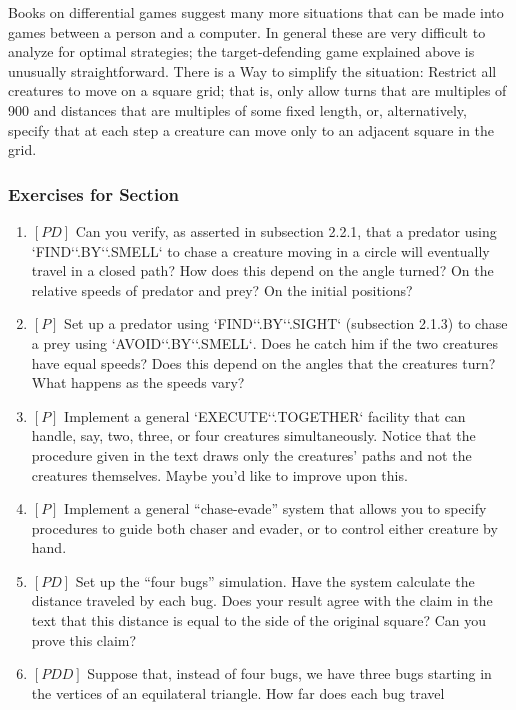 \documentclass{book}
\begin{document}
Books on differential games suggest many more situations that can be
made into games between a person and a computer. In general these
are very difficult to analyze for optimal strategies; the target-defending
game explained above is unusually straightforward. There is a Way to
simplify the situation: Restrict all creatures to move on a square grid;
that is, only allow turns that are multiples of 900 and distances that
are multiples of some fixed length, or, alternatively, specify that at each
step a creature can move only to an adjacent square in the grid.

\subsubsection{Exercises for Section \thesection}
\begin{enumerate}
\item $[PD]$ Can you verify, as asserted in subsection 2.2.1, that a predator
using \textsc{`FIND`}\textsc{`.BY`}\textsc{`.SMELL`} to chase a creature moving in a circle will eventually travel in a closed path? How does this depend on the angle turned?
On the relative speeds of predator and prey? On the initial positions?
\item $[P]$ Set up a predator using \textsc{`FIND`}\textsc{`.BY`}\textsc{`.SIGHT`} (subsection 2.1.3) to chase
a prey using \textsc{`AVOID`}\textsc{`.BY`}\textsc{`.SMELL`}. Does he catch him if the two creatures
have equal speeds? Does this depend on the angles that the creatures
turn? What happens as the speeds vary?
\item $[P]$ Implement a general \textsc{`EXECUTE`}\textsc{`.TOGETHER`} facility that can handle,
say, two, three, or four creatures simultaneously. Notice that the procedure given in the text draws only the creatures' paths and not the
creatures themselves. Maybe you'd like to improve upon this.
\item $[P]$ Implement a general ``chase-evade'' system that allows you to
specify procedures to guide both chaser and evader, or to control either
creature by hand.
\item $[PD]$ Set up the ``four bugs'' simulation. Have the system calculate
the distance traveled by each bug. Does your result agree with the claim
in the text that this distance is equal to the side of the original square?
Can you prove this claim?
\item $[PDD]$ Suppose that, instead of four bugs, we have three bugs starting
in the vertices of an equilateral triangle. How far does each bug travel

\end{enumerate}
\end{document}
